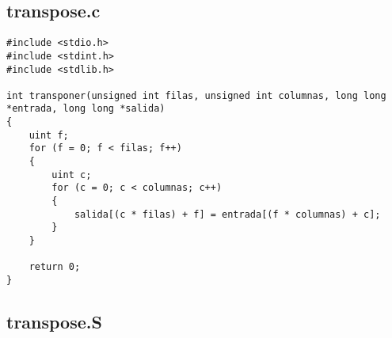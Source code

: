 \documentclass[a4paper]{article}
\begin{document}
\subsection{transpose.c}
\begin{verbatim}
#include <stdio.h>
#include <stdint.h>
#include <stdlib.h>

int transponer(unsigned int filas, unsigned int columnas, long long *entrada, long long *salida)
{
    uint f;
    for (f = 0; f < filas; f++)
    {
        uint c;
        for (c = 0; c < columnas; c++)
        {
            salida[(c * filas) + f] = entrada[(f * columnas) + c];
        }
    }

    return 0;
}
\end{verbatim}

\subsection{transpose.S}
\end{document}
